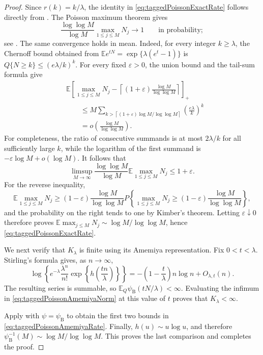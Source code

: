 \documentclass[11pt]{article}
\theoremstyle{definition}
\theoremstyle{remark}
\newcommand{\Ee}{\mathbb E}
\newcommand{\1}{\boldsymbol{1}}
\begin{document}
\begin{proof}
Since \(r(k)=k/\lambda\), the identity in
\eqref{eq:taggedPoissonExactRate} follows directly from
. The Poisson maximum theorem gives
\[
\frac{\log\log M}{\log M}\max_{1\le j\le M}N_j
\longrightarrow1
\qquad\text{in probability};
\]
see \cite{Kimber1983}. The same convergence holds in mean. Indeed, for
every integer \(k\ge\lambda\), the Chernoff bound obtained from
\(\Ee e^{tN}=\exp\{\lambda(e^t-1)\}\) is
\(Q\{N\ge k\}\le(e\lambda/k)^k\). For every fixed
\(\varepsilon>0\), the union bound and the tail-sum formula give
\begin{align*}
&
\Ee\left[
\max_{1\le j\le M}N_j
-
\left\lceil
(1+\varepsilon)\frac{\log M}{\log\log M}
\right\rceil
\right]_+
\\
&\qquad\le
M
\sum_{k>
\left\lceil(1+\varepsilon)\log M/\log\log M\right\rceil}
\left(\frac{e\lambda}{k}\right)^k
\\
&\qquad=
o\left(\frac{\log M}{\log\log M}\right).
\end{align*}
For completeness, the ratio of consecutive summands is at most
\(2\lambda/k\) for all sufficiently large \(k\), while the logarithm of
the first summand is \(-\varepsilon\log M+o(\log M)\). It follows that
\[
\limsup_{M\to\infty}
\frac{\log\log M}{\log M}
\Ee\max_{1\le j\le M}N_j
\le1+\varepsilon.
\]
For the reverse inequality,
\[
\Ee\max_{1\le j\le M}N_j
\ge
(1-\varepsilon)\frac{\log M}{\log\log M}
P\left\{
\max_{1\le j\le M}N_j
\ge
(1-\varepsilon)\frac{\log M}{\log\log M}
\right\},
\]
and the probability on the right tends to one by Kimber's theorem. Letting
\(\varepsilon\downarrow0\) therefore proves
\(\Ee\max_{j\le M}N_j\sim\log M/\log\log M\), hence
\eqref{eq:taggedPoissonExactRate}.

We next verify that \(K_\lambda\) is finite using its Amemiya representation.
Fix \(0<t<\lambda\). Stirling's formula gives, as \(n\to\infty\),
\[
\log\left\{
e^{-\lambda}\frac{\lambda^n}{n!}
\exp\left\{h\!\left(\frac{tn}{\lambda}\right)\right\}
\right\}
=
-\left(1-\frac{t}{\lambda}\right)n\log n+O_{\lambda,t}(n).
\]
The resulting series is summable, so
\(\Ee_Q\psi_{\mathrm B}(tN/\lambda)<\infty\). Evaluating the infimum in
\eqref{eq:taggedPoissonAmemiyaNorm} at this value of \(t\) proves that
\(K_\lambda<\infty\).

Apply  with
\(\psi=\psi_{\mathrm B}\) to obtain the first two bounds in
\eqref{eq:taggedPoissonAmemiyaRate}. Finally,
\(h(u)\sim u\log u\), and therefore
\(\psi_{\mathrm B}^{-1}(M)\sim\log M/\log\log M\). This proves the last
comparison and completes the proof.
\end{proof}
\end{document}
